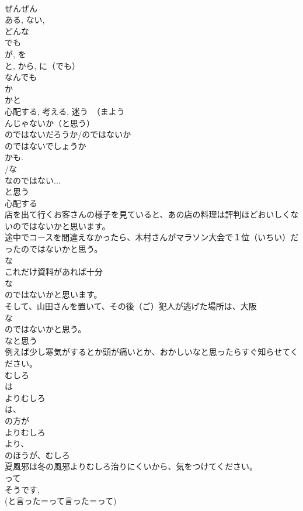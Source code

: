\documentclass[8pt]{extreport}
\begin{document}
\begin{CJK}{UTF8}{min}
\\	ぜんぜん
\\	ある, ない, 
\\	どんな
\\	でも
\\	が, を 
\\	と, から, に（でも） 
\\	なんでも 
\\	か
\\	かと
\\	心配する, 考える, 迷う　（まよう 
\\	んじゃないか（と思う）
\\	のではないだろうか/のではないか
\\	のではないでしょうか
\\	かも.
\\	/な
\\	なのではない...
\\	と思う 
\\	心配する 
\\	店を出て行くお客さんの様子を見ていると、あの店の料理は評判ほどおいしくないのではないかと思います。
\\	途中でコースを間違えなかったら、木村さんがマラソン大会で１位（いちい）だったのではないかと思う。
\\	な
\\	これだけ資料があれば十分
\\	な
\\	のではないかと思います。
\\	そして、山田さんを置いて、その後（ご）犯人が逃げた場所は、大阪
\\	な
\\	のではないかと思う。
\\	なと思う
\\	例えば少し寒気がするとか頭が痛いとか、おかしいなと思ったらすぐ知らせてください。
\\	むしろ
\\	は
\\	よりむしろ
\\	は、
\\	の方が
\\	よりむしろ
\\	より、
\\	のほうが、むしろ
\\	夏風邪は冬の風邪よりむしろ治りにくいから、気をつけてください。	
\\	って
\\	そうです, 
\\	(と言った＝って言った＝って)

\end{CJK}
\end{document}
